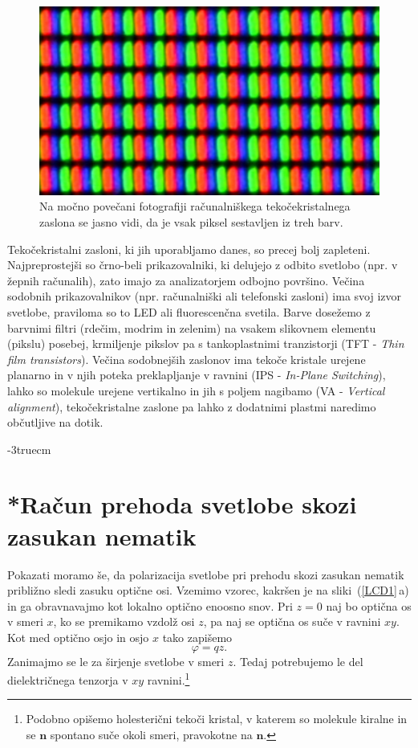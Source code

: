 \begin{figure}[h!]
\centering
\includegraphics[width=80truemm]{slike/09_LCD.jpg}
\caption{Na močno povečani fotografiji računalniškega tekočekristalnega zaslona se 
jasno vidi, da je vsak piksel sestavljen iz treh barv.}
\end{figure}
\begin{remark}
Tekočekristalni zasloni, ki jih uporabljamo danes, so precej bolj zapleteni.
Najpreprostejši so črno-beli prikazovalniki, ki delujejo z odbito svetlobo (npr. 
v žepnih računalih), zato imajo za analizatorjem odbojno površino. Večina 
sodobnih prikazovalnikov (npr. računalniški ali telefonski zasloni) ima svoj izvor svetlobe, 
praviloma so to LED ali fluorescenčna svetila.
Barve dosežemo z barvnimi filtri (rdečim, modrim in zelenim) na vsakem 
slikovnem elementu (pikslu) posebej, krmiljenje pikslov pa s tankoplastnimi 
tranzistorji (TFT - {\it Thin film transistors}). Večina
sodobnejših zaslonov ima tekoče kristale urejene planarno in v njih poteka
preklapljanje v ravnini (IPS - {\it In-Plane Switching}), lahko so molekule
urejene vertikalno in jih s poljem nagibamo (VA - {\it Vertical alignment}), tekočekristalne 
zaslone pa lahko z dodatnimi plastmi naredimo občutljive na dotik.
\end{remark}
\vglue-3truecm
\section{*Račun prehoda svetlobe skozi zasukan nematik}
Pokazati moramo še, da polarizacija svetlobe pri prehodu skozi zasukan nematik 
približno sledi zasuku optične osi. 
Vzemimo vzorec, kakršen je na sliki~(\ref{LCD1}\,a) in ga obravnavajmo
kot lokalno optično enoosno snov. Pri $z=0$ naj bo optična
os v smeri $x$, ko se premikamo vzdolž osi $z$, pa naj se optična os suče
v ravnini $xy$. Kot med optično osjo in osjo $x$ tako zapišemo 
\begin{equation}
\varphi=qz.
\label{7.58}
\end{equation}
Zanimajmo se le za širjenje svetlobe v smeri $z$. 
Tedaj potrebujemo le del dielektričnega
tenzorja v $xy$ ravnini.\footnote{Podobno opišemo holesterični tekoči kristal, v
katerem so molekule kiralne in se $\mathbf{n}$ spontano suče okoli
smeri, pravokotne na $\mathbf{n}$.} 

